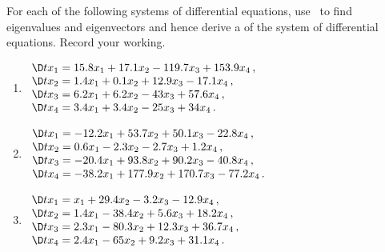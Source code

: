 \begin{exercise} \label{ex:} 
For each of the following systems of differential equations, use \script\ to find eigenvalues and eigenvectors and hence derive a  of the system of differential equations.  
Record your working.

\begin{enumerate}
\item \(\begin{array}{l} 
\D t{x_1}= 15.8x_1 +17.1x_2 -119.7x_3 +153.9x_4\,,\\
\D t{x_2}= 1.4x_1 +0.1x_2 +12.9x_3 -17.1x_4\,,\\
\D t{x_3}= 6.2x_1 +6.2x_2 -43x_3 +57.6x_4\,,\\
\D t{x_4}= 3.4x_1 +3.4x_2 -25x_3 +34x_4\,.
\end{array}\)
\setbox\ajrqrbox\hbox{}\marginpar{\usebox{\ajrqrbox}}%

\item \(\begin{array}{l} 
\D t{x_1}= -12.2x_1 +53.7x_2 +50.1x_3 -22.8x_4\,,\\
\D t{x_2}= 0.6x_1 -2.3x_2 -2.7x_3 +1.2x_4\,,\\
\D t{x_3}= -20.4x_1 +93.8x_2 +90.2x_3 -40.8x_4\,,\\
\D t{x_4}= -38.2x_1 +177.9x_2 +170.7x_3 -77.2x_4\,.
\end{array}\)
\setbox\ajrqrbox\hbox{}\marginpar{\usebox{\ajrqrbox}}%

\item \(\begin{array}{l} 
\D t{x_1}= x_1 +29.4x_2 -3.2x_3 -12.9x_4\,,\\
\D t{x_2}= 1.4x_1 -38.4x_2 +5.6x_3 +18.2x_4\,,\\
\D t{x_3}= 2.3x_1 -80.3x_2 +12.3x_3 +36.7x_4\,,\\
\D t{x_4}= 2.4x_1 -65x_2 +9.2x_3 +31.1x_4\,.
\end{array}\)
\setbox\ajrqrbox\hbox{}\marginpar{\usebox{\ajrqrbox}}%


\end{enumerate}
\end{exercise}
